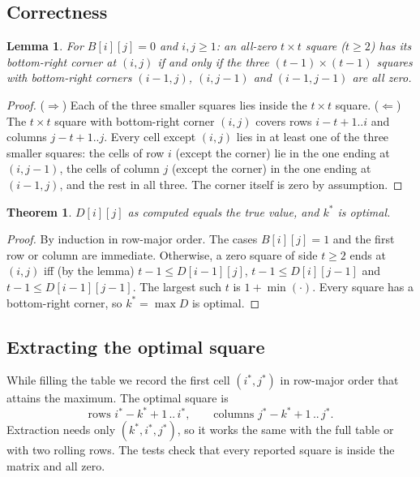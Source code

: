 \documentclass[11pt]{article}
\newtheorem{lemma}{Lemma}
\newtheorem{theorem}{Theorem}
\begin{document}
\subsection{Correctness}
\begin{lemma}
For $B[i][j]=0$ and $i,j\ge1$: an all-zero $t\times t$ square ($t\ge2$) has
its bottom-right corner at $(i,j)$ if and only if the three $(t-1)\times(t-1)$
squares with bottom-right corners $(i-1,j)$, $(i,j-1)$ and $(i-1,j-1)$ are all zero.
\end{lemma}
\begin{proof}
($\Rightarrow$) Each of the three smaller squares lies inside the $t\times t$
square. ($\Leftarrow$) The $t\times t$ square with bottom-right corner $(i,j)$
covers rows $i-t+1..i$ and columns $j-t+1..j$. Every cell except $(i,j)$ lies
in at least one of the three smaller squares: the cells of row $i$ (except the
corner) lie in the one ending at $(i,j-1)$, the cells of column $j$ (except the
corner) in the one ending at $(i-1,j)$, and the rest in all three. The
corner itself is zero by assumption.
\end{proof}
\begin{theorem}
$D[i][j]$ as computed equals the true value, and $k^\ast$ is optimal.
\end{theorem}
\begin{proof}
By induction in row-major order. The cases $B[i][j]=1$ and the first row or
column are immediate. Otherwise, a zero square of side $t\ge2$ ends at $(i,j)$
iff (by the lemma) $t-1\le D[i-1][j]$, $t-1\le D[i][j-1]$ and
$t-1\le D[i-1][j-1]$. The largest such $t$ is $1+\min(\cdot)$. Every square
has a bottom-right corner, so $k^\ast=\max D$ is optimal.
\end{proof}

\subsection{Extracting the optimal square}
While filling the table we record the first cell $(i^\ast,j^\ast)$ in row-major
order that attains the maximum. The optimal square is
\[
\text{rows } i^\ast-k^\ast+1 \,..\, i^\ast,\qquad \text{columns } j^\ast-k^\ast+1 \,..\, j^\ast .
\]
Extraction needs only $(k^\ast,i^\ast,j^\ast)$, so it works the same with the full table or
with two rolling rows. The tests check that every reported square is
inside the matrix and all zero.
\end{document}
